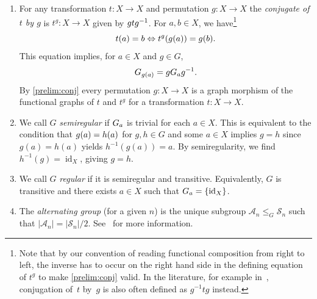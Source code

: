 \begin{enumerate}
	\label{def:conjugation}
	\item For any transformation $t \colon X \to X$ and permutation $g \colon X \to X$ 
	the \emph{conjugate of $t$ by $g$} is $t^g \colon X \to X$ given by 
	$\concat{g^{-1}}{\concat{t}{g}}$. For $a,b \in X$, we have\footnote{Note that by our convention of reading functional composition from right to left, the inverse has to occur on the right hand side in the defining equation of $t^g$ to make \cref{prelim:conj} valid. In the literature, for example in~\cite{Kurzweil04}, 
	conjugation of~$t$ by~$g$ is also often defined as $g^{-1} t g$ instead.}
	\begin{equation}\label{prelim:conj}
		\applyfunc{a}{t} = b \Leftrightarrow 
		\applyfunc{\applyfunc{a}{g}}{t^g} = \applyfunc{b}{g}.	
	\end{equation}
	This equation implies, for $a \in X$ and $g \in G$,
	\begin{equation}\label{prelim:eqn:stab}
		\Stab{\applyfunc{a}{g}}{G} = g\Stab{a}{G}g^{-1}.
	\end{equation}		
	By \cref{prelim:conj}
	every permutation $g \colon X \to X$ 
	is a graph morphism of the functional graphs of $t$
	and $t^g$ for a transformation $t \colon X \to X$.	
	
	\item We call $G$ \emph{semiregular}
	if $\Stab{a}{G}$ is trivial for each $a \in X$.
	This is equivalent to the condition that $\applyfunc{a}{g} = \applyfunc{a}{h}$
    for $g,h \in G$ and some $a \in X$ implies $g = h$
    since $g(a) = h(a)$ yields $h^{-1}(g(a)) = a$.
    By semiregularity, we find $h^{-1}(g) = \operatorname{id}_X$,
    giving $g = h$.
	
	\item We call $G$ \emph{regular}  
	if it is semiregular and transitive.
	Equivalently, $G$ is transitive and there exists $a \in X$
	such that $\Stab{a}{G} = \{ \operatorname{id}_{X}\}$.
		
	\label{def:A_n}
	\item The \emph{alternating group} (for a given $n$) 
	is the unique subgroup $\mathcal A_n \le_G \mathcal S_n$ such that $|\mathcal A_n| = |\mathcal S_n| / 2$. 
	See~\cite{cameron_1999} for more information.	
\end{enumerate}

